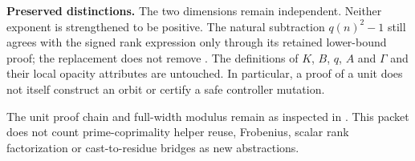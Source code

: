 \textbf{Preserved distinctions.} The two dimensions remain independent. Neither exponent is strengthened to be positive. The natural subtraction $q(n)^2-1$ still agrees with the signed rank expression only through its retained lower-bound proof; the replacement does not remove . The definitions of $K$, $B$, $q$, $A$ and $\Gamma$ and their local opacity attributes are untouched. In particular, a proof of a unit does not itself construct an orbit or certify a safe controller mutation.

The unit proof chain and full-width modulus remain as inspected in
. This packet does not count prime-coprimality helper reuse, Frobenius, scalar rank factorization or cast-to-residue bridges as new abstractions.
